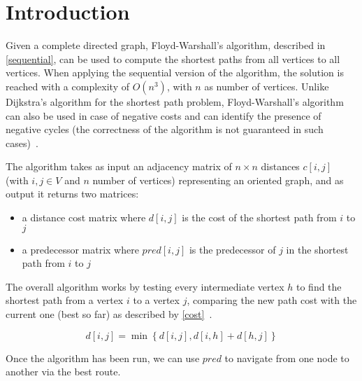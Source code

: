 \section{Introduction}\label{introduction}

Given a complete directed  graph, Floyd-Warshall's algorithm, described in \cref{sequential}, can be used to compute the shortest paths from all vertices to all vertices.
When applying the sequential version of the algorithm, the solution is reached with a complexity of \(O(n^3)\), with \(n\) as number of vertices.
Unlike Dijkstra's algorithm for the shortest path problem, Floyd-Warshall's algorithm can also be used in case of negative costs and can identify the presence of negative cycles 
(the correctness of the algorithm is not guaranteed in such cases)~\cite{fischetti}.

The algorithm takes as input an adjacency matrix of $n \times n$  distances $c[i,j]$ (with $i,j \in V$ and $n$ number of vertices) representing an oriented graph, and as output it returns two matrices:
\begin{itemize}
    \item a distance cost matrix where \(d[i,j]\) is the cost of the shortest path from \(i\) to \(j\)
    \item a predecessor matrix where \(pred[i,j]\) is the predecessor of \(j\) in the shortest path from \(i\) to \(j\)
  \end{itemize}

The overall algorithm works by testing every intermediate vertex \(h\) to find the shortest path from a vertex \(i\) to a vertex \(j\),
comparing the new path cost with the current one (best so far) as described by \cref{cost}~\cite{fischetti}.

\begin{equation} \label{cost}
    d[i,j] = \min\left\{ d[i,j], d[i,h]+d[h,j] \right\}
\end{equation}

Once the algorithm has been run, we can use \(pred\) to navigate from one node to another via the best route.

